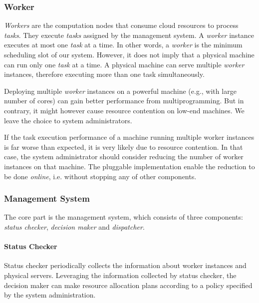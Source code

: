 \subsubsection{Worker}	%

\emph{Workers} are the computation nodes that consume cloud resources 
to process \emph{tasks}.
They execute \emph{tasks} assigned by the management system.
A \emph{worker} instance executes at most one \emph{task} at a time.
In other words, a \emph{worker} is the minimum scheduling slot of our 
system.
However, it does not imply that a physical machine can run only one 
\emph{task} at a time.
A physical machine can serve multiple \emph{worker} instances, 
therefore executing more than one task simultaneously.

Deploying multiple \emph{worker} instances on a powerful machine (e.g.,
with large number of cores) can gain better performance from 
multiprogramming.
But in contrary, it might however cause resource contention on low-end 
machines.
We leave the choice to system administrators.

If the task execution performance of a machine running multiple worker
instances is far worse than expected, it is very likely due to resource
contention.
In that case, the system administrator should consider reducing the
number of worker instances on that machine.
The pluggable implementation enable the reduction to be done \emph{
online}, i.e. without stopping any of other components.



\subsubsection{Management System}

The core part is the management system, which consists of three
components: \emph{status checker}, \emph{decision maker} and
\emph{dispatcher}.


\paragraph{Status Checker}

Status checker periodically collects the information about worker
instances and physical servers.
Leveraging the information collected by status checker, the decision
maker can make resource allocation plans according to a policy specified
by the system administration.

